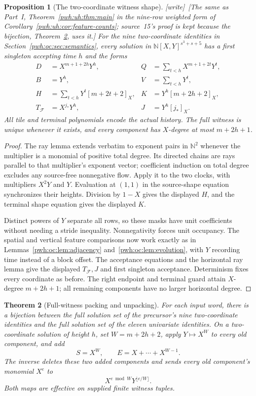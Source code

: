 \documentclass[11pt,letterpaper]{article}
\numberwithin{equation}{section}
\newtheorem{theorem}{Theorem}[section]
\newtheorem{proposition}[theorem]{Proposition}
\theoremstyle{definition}
\newcommand{\N}{\mathbb N}
\newcommand{\F}{\mathcal F}
\newcommand{\rep}[1]{[#1]_X}
\newcommand{\TF}{T_{\F}}
\newcommand{\wtag}{\textup{[write]}}
\begin{document}
\begin{proposition}[The two-coordinate witness shape]
\label{pwh:oc:prop:bivariate}
\wtag\ [The same as Part~I, Theorem~\ref{pwh:uh:thm:main} in the nine-row
weighted form of Corollary~\ref{pwh:uh:cor:feature-counts}; source~15's
proof is kept because the bijection, Theorem~\ref{pwh:oc:thm:bijection},
uses it.]
For the nine two-coordinate identities in Section~\ref{pwh:oc:sec:semantics},
every solution in $\N[X,Y]^{s^3+s+5}$ has a first singleton accepting time
$h$ and the forms
\begin{align*}
 D&=X^{m+1+2h}Y^h,&Q&=\sum_{t<h}X^{m+1+2t}Y^t,\\
 B&=Y^h,&V&=\sum_{t<h}Y^t,\\
 H&=\sum_{t<h}Y^t\rep{m+2t+2},&
 K&=Y^h\rep{m+2h+2},\\
 \TF&=X^{j_*}Y^h,&J&=Y^h\rep{j_*}.
\end{align*}
All tile and terminal polynomials encode the actual history. The full
witness is unique whenever it exists, and every component has $X$-degree
at most $m+2h+1$.
\end{proposition}

\begin{proof}
The ray lemma extends verbatim to exponent pairs in $\N^2$ whenever the
multiplier is a monomial of positive total degree. Its directed chains
are rays parallel to that multiplier's exponent vector; coefficient
induction on total degree excludes any source-free nonnegative flow.
Apply it to the two clocks, with multipliers $X^2Y$ and $Y$.
Evaluation at $(1,1)$ in the source-shape equation synchronizes their
heights. Division by $1-X$ gives the displayed $H$, and the terminal
shape equation gives the displayed $K$.

Distinct powers of $Y$ separate all rows, so these masks have unit
coefficients without needing a stride inequality. Nonnegativity forces
unit occupancy. The spatial and vertical feature comparisons now work
exactly as in Lemmas~\ref{pwh:oc:lem:adjacency} and~\ref{pwh:oc:lem:evolution}, with
$Y$ recording time instead of a block offset. The acceptance equations
and the horizontal ray lemma give the displayed $\TF,J$ and first
singleton acceptance. Determinism fixes every coordinate as before.
The right endpoint and terminal guard attain $X$-degree $m+2h+1$;
all remaining components have no larger horizontal degree.
\end{proof}

\begin{theorem}[Full-witness packing and unpacking]
\label{pwh:oc:thm:bijection}
For each input word, there is a bijection between the full solution set
of the precursor's nine two-coordinate identities and the full solution
set of the eleven univariate identities. On a two-coordinate solution of
height $h$, set $W=m+2h+2$, apply $Y\mapsto X^W$ to every old component,
and add
\[
 S=X^W,\qquad E=X+\cdots+X^{W-1}.
\]
The inverse deletes these two added components and sends every old
component's monomial $X^e$ to
\[
 X^{e\bmod W}Y^{\lfloor e/W\rfloor}.
\]
Both maps are effective on supplied finite witness tuples.
\end{theorem}
\end{document}
